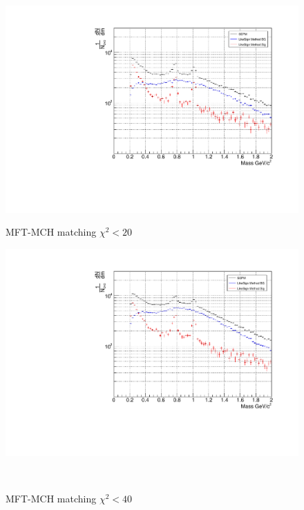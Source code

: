             \begin{figure}[H]
                \centering
                \begin{minipage}{0.45\textwidth}
                    \centering
                    \includegraphics[width=\textwidth]{fig/3_4_4_CB_chi2_20.pdf}
                    \caption*{MFT-MCH matching $\chi^2 < 20$}
                \end{minipage}
                \hfill
                \begin{minipage}{0.45\textwidth}
                    \centering
                    \includegraphics[width=\textwidth]{fig/3_4_4_CB_chi2_40.pdf}
                    \caption*{MFT-MCH matching $\chi^2 < 40$}
                \end{minipage}
                \\

\end{figure}
